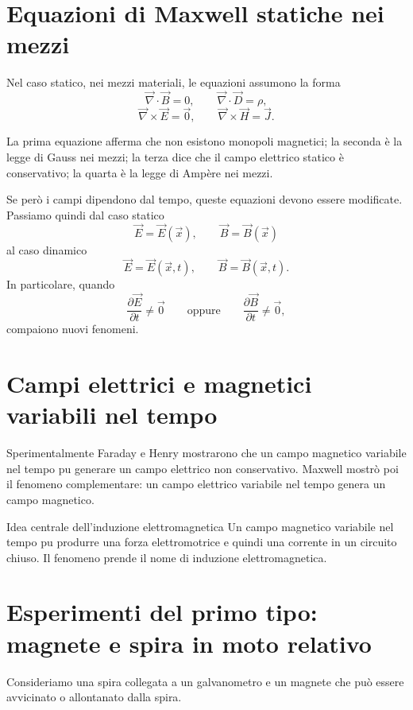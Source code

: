 \documentclass[a4paper]{article}
\begin{document}
\section{Equazioni di Maxwell statiche nei mezzi}

Nel caso statico, nei mezzi materiali, le equazioni assumono la forma
\[
\vec{\nabla}\cdot\vec{B}=0,
\qquad
\vec{\nabla}\cdot\vec{D}=\rho,
\]
\[
\vec{\nabla}\times\vec{E}=\vec{0},
\qquad
\vec{\nabla}\times\vec{H}=\vec{J}.
\]

La prima equazione afferma che non esistono monopoli magnetici; la seconda è la legge di Gauss nei mezzi; la terza dice che il campo elettrico statico è conservativo; la quarta è la legge di Ampère nei mezzi.

Se però i campi dipendono dal tempo, queste equazioni devono essere modificate. Passiamo quindi dal caso statico
\[
\vec{E}=\vec{E}(\vec{x}),
\qquad
\vec{B}=\vec{B}(\vec{x})
\]
al caso dinamico
\[
\vec{E}=\vec{E}(\vec{x},t),
\qquad
\vec{B}=\vec{B}(\vec{x},t).
\]
In particolare, quando
\[
\frac{\partial\vec{E}}{\partial t}\neq\vec{0}
\qquad\text{oppure}\qquad
\frac{\partial\vec{B}}{\partial t}\neq\vec{0},
\]
compaiono nuovi fenomeni.

\section{Campi elettrici e magnetici variabili nel tempo}

Sperimentalmente Faraday e Henry mostrarono che un campo magnetico variabile nel tempo pu generare un campo elettrico non conservativo. Maxwell mostrò poi il fenomeno complementare: un campo elettrico variabile nel tempo genera un campo magnetico.

\begin{snippetproposition}{Idea centrale dell'induzione elettromagnetica}
Un campo magnetico variabile nel tempo pu produrre una forza elettromotrice e quindi una corrente in un circuito chiuso. Il fenomeno prende il nome di induzione elettromagnetica.
\end{snippetproposition}

\section{Esperimenti del primo tipo: magnete e spira in moto relativo}

Consideriamo una spira collegata a un galvanometro e un magnete che può essere avvicinato o allontanato dalla spira.
\end{document}
